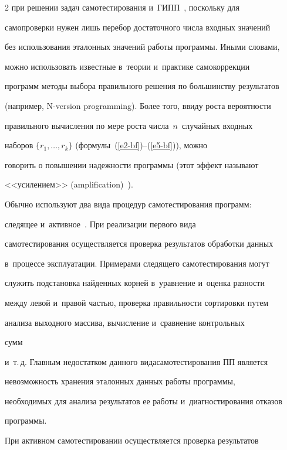\begin{multicols}{2}
при решении задач самотестирования и~ГИПП~\cite{12-bf}, поскольку для 


самопроверки нужен лишь перебор достаточного числа входных значений 


без использования эталонных значений работы программы. Иными словами, 


можно использовать известные в~теории и~практике самокоррекции 


программ методы выбора правильного решения по большинству результатов 


(например, N-version programming). Более того, ввиду роста вероятности 


правильного вычисления по мере роста числа~$n$~случайных входных 


наборов $\{r_1,\ldots , r_k\}$ (формулы~(\ref{e2-bf})--(\ref{e5-bf})), можно 


говорить о повышении надежности программы (этот эффект называют 


<<усилением>> (amplification)~\cite{16-bf}).


    


    Обычно используют два вида процедур са\-мо\-тес\-ти\-ро\-ва\-ния программ: 


следящее и~активное~\cite{4-bf, 17-bf}. При реализации первого вида 


самотестирования осуществляется проверка результатов обработки данных 


в~процессе эксплуатации. Примерами следящего самотестирования могут 


служить подстановка найденных корней в~уравнение и~оценка разности 


между левой и~правой частью, проверка правильности сортировки путем 


анализа выходного массива, вычисление и~сравнение контрольных\linebreak


 сумм 


и~т.\,д. Главным недостатком данного вида\linebreak самотестирования ПП является 


невозможность хранения эталонных данных работы программы, 


необходимых для анализа результатов ее работы и~диагностирования отказов 


программы.


    


    При активном самотестировании осуществляется проверка результатов 



\end{multicols}
